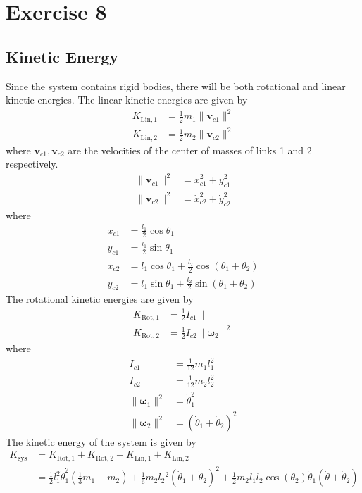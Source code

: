 \section{Exercise 8}
\subsection{Kinetic Energy}
Since the system contains rigid bodies, there will be both rotational and linear kinetic energies.
The linear kinetic energies are given by
\begin{align*}
	K_{\text{Lin},1} &= \frac{1}{2}m_1\|\bm{v}_{c1}\|^2 \\
	K_{\text{Lin},2} &= \frac{1}{2}m_2\|\bm{v}_{c2}\|^2
\end{align*}
where $\bm{v}_{c1}, \bm{v}_{c2}$ are the velocities of the center of masses of links 1 and 2 respectively.
\begin{align*}
	\|\bm{v}_{c1}\|^2 &= \dot{x}_{c1}^2 + \dot{y}_{c1}^2 \\
	\|\bm{v}_{c2}\|^2 &= \dot{x}_{c2}^2 + \dot{y}_{c2}^2
\end{align*}
where 
\begin{align*}
	x_{c1} &= \frac{l_1}{2}\cos\theta_1\\
	y_{c1} &= \frac{l_1}{2}\sin\theta_1\\
	x_{c2} &= l_1\cos\theta_1 + \frac{l_2}{2}\cos\left(\theta_1 + \theta_2\right)\\
	y_{c2} &= l_1\sin\theta_1 + \frac{l_2}{2}\sin\left(\theta_1 + \theta_2\right)
\end{align*}
The rotational kinetic energies are given by
\begin{align*}
	K_{\text{Rot},1} &= \frac{1}{2}I_{c1}\| \\
	K_{\text{Rot},2} &= \frac{1}{2}I_{c2}\|\bm{\omega}_{2}\|^2
\end{align*}
where 
\begin{align*}
	I_{c1} &= \frac{1}{12}m_1 l_1^2\\
	I_{c2} &= \frac{1}{12}m_2 l_2^2 \\
	\|\bm{\omega}_{1}\|^2 &= \dot{\theta}_1^2\\
	\|\bm{\omega}_{2}\|^2 &= \left(\dot{\theta}_1 + \dot{\theta}_{2}\right)^2
\end{align*}
The kinetic energy of the system is given by
\begin{align*}
	K_{\text{sys}} &= K_{\text{Rot},1} + K_{\text{Rot},2} + K_{\text{Lin},1} + K_{\text{Lin},2}\\
	&= \frac{1}{2} l_1^2 \dot{\theta}_1^2\left(\frac{1}{3} m_1+m_2\right)+\frac{1}{6} m_2 l_2{ }^2\left(\dot{\theta}_1+\dot{\theta}_2\right)^2+\frac{1}{2} m_2 l_1 l_2 \cos \left(\theta_2\right) \dot{\theta}_1\left(\dot{\theta}+\dot{\theta}_2\right)
\end{align*}

